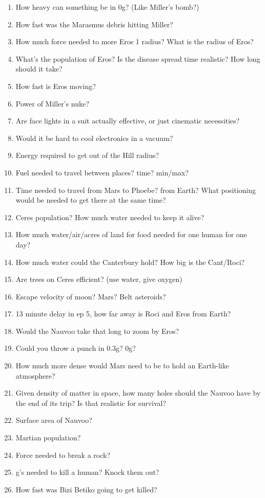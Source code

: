 \documentclass{amsart}
\theoremstyle{definition}
\begin{document}
\begin{enumerate}
    \item How heavy can something be in 0g? (Like Miller's bomb?)
    \item How fast was the Marasmus debris hitting Miller?
    \item How much force needed to more Eros 1 radius?
    \subitem What is the radius of Eros?
    \item What's the population of Eros?
    \subitem Is the disease spread time realistic? How long should it take?
    \item How fast is Eros moving?
    \item Power of Miller's nuke?
    \item Are face lights in a suit actually effective, or just cinematic necessities?
    \item Would it be hard to cool electronics in a vacuum?
    \item Energy required to get out of the Hill radius?
    \item Fuel needed to travel between places? time? min/max?
    \item Time needed to travel from Mars to Phoebe? from Earth? What positioning would be needed to get there at the same time?
    \item Ceres population? How much water needed to keep it alive?
    \item How much water/air/acres of land for food needed for one human for one day?
    \item How much water could the Canterbury hold? How big is the Cant/Roci?
    \item Are trees on Ceres efficient? (use water, give oxygen)
    \item Escape velocity of moon? Mars? Belt asteroids?
    \item 13 minute delay in ep 5, how far away is Roci and Eros from Earth?
    \item Would the Nauvoo take that long to zoom by Eros?
    \item Could you throw a punch in 0.3g? 0g?
    \item How much more dense would Mars need to be to hold an Earth-like atmosphere?
    \item Given density of matter in space, how many holes should the Nauvoo have by the end of its trip? Is that realistic for survival?
    \item Surface area of Nauvoo?
    \item Martian population?
    \item Force needed to break a rock?
    \item g's needed to kill a human? Knock them out?
    \item How fast was Bizi Betiko going to get killed?
    

\end{enumerate}
\end{document}
